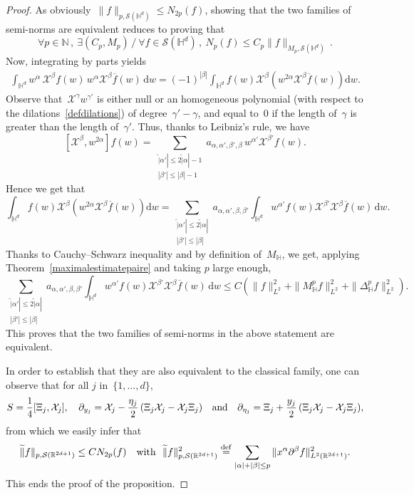 \documentclass[10pt]{amsart}
\theoremstyle{definition}\newtheorem{defi}[theo]{Definition}\newtheorem{rema}[theo]{Remark}\newtheorem{exam}[theo]{Example}\newtheorem{exem}[theo]{Example}\newtheorem{nota}[theo]{Notation}
\newcommand*\sumetage[2]{\sum_{\substack{{#1}\\{#2}}}}
\newcommand{\D}{\Delta}
\newcommand{\wt}{\widetilde}
\newcommand*\cS{\mathcal{S}}
\newcommand*\cX{\mathcal{X}}
\newcommand*\N{\mathbb{N}}
\newcommand*\R{\mathbb{R}}
\newcommand*\bbH{\mathbb{H}}
\newcommand{\andf}{\quad\hbox{and}\quad}
\newcommand*\eqdefa{\overset{\mathrm{def}}{=}}
\newcommand*{\dd}{\mathrm{d}}
\newcommand{\dw}{\dd w}
\renewcommand*{\cdotp}{.}
\let\oldexists\exists
\renewcommand*{\exists}{\mathrel{\oldexists}}
\let\oldforall\forall
\renewcommand*{\forall}{\mathrel{\oldforall}}
\begin{document}
\begin{proof}
As obviously~$\|f\|_{p,\cS(\bbH^d)}\leq N_{2p} (f)$, showing that the two families of semi-norms are equivalent reduces to proving that
\begin{equation}\label{c:schwartzdemooeq3}
\forall p\in \N\,,\ \exists (C_p,M_p)\,/\ \forall f\in \cS(\bbH^d)\,,\ N_p(f)\leq C_p\|f\|_{M_p,\cS(\bbH^d)} \,.
\end{equation}
Now, integrating by parts yields
\begin{align*}
\int_{\bbH^d} w^\alpha \,\cX^\beta f(w) \,w^\alpha \cX^\beta\overline f(w)\,\dw = (-1)^{|\beta|} \int_{\bbH^d} f(w) \cX^\beta\left(w^{2\alpha} \cX^\beta \overline f(w)\right)\dw.
\end{align*}
Observe that~$\cX^\gamma w^{\gamma'}$ is either null or an homogeneous polynomial (with respect to the dilations~\eqref{defdilations}) of degree~$\gamma'-\gamma$, and equal to~$0$ if the length of~$\gamma$ is greater than the length of~$\gamma'$. Thus, thanks to Leibniz's rule, we have
\begin{equation}\label{c:schwartzdemooeq0}
[\cX^\beta,w^{2\alpha}] f(w) = \sumetage { \wt |\alpha'|\leq 2\wt |\alpha|-1} {|\beta'|\leq|\beta|-1} a_{\alpha,\alpha',\beta',\beta} \,w^{\alpha'} \cX^{\beta'}f(w).
\end{equation}
Hence we get that
\[
\int_{\bbH^d} f(w) \cX^\beta\left(w^{2\alpha} \cX^\beta \overline f(w)\right)\dw =
\sumetage {\wt|\alpha'|\leq 2 \wt |\alpha|} {|\beta'|\leq |\beta|} a_{\alpha,\alpha',\beta,\beta'} \int_{\bbH^d} w^{\alpha'} f(w) \cX^{\beta'} \cX^\beta\overline f(w) \,\dw.
\]
Thanks to Cauchy--Schwarz inequality and by definition of~$M_\bbH$, we get, applying Theorem~\ref{maximalestimatepaire} and taking $p$ large enough,
\[
\sumetage {\wt|\alpha'|\leq 2 \wt |\alpha|} {|\beta'|\leq |\beta|} a_{\alpha,\alpha',\beta,\beta'} \int_{\bbH^d} w^{\alpha'} f(w) \cX^{\beta'} \cX^\beta\overline f(w)\, \dw
\leq C\left(\|f\|_{L^2}^2 + \|M_\bbH^{p} f\|_{L^2} ^2+ \|\D_\bbH^{p} f\|_{L^2}^2\right)\cdotp
\]
This proves that the two families of semi-norms in the above statement are equivalent.

In order to establish that they are also equivalent to the classical family, one can observe that for all $j$ in~$ \{1, \dots,d \}$,
\[
S = \frac 1 4 [\Xi_j,\cX_j],\quad \partial_{y_j}= \cX_j - \frac {\eta_j} 2 \,(\Xi_j\cX_j- \cX_j \Xi_j) \andf \partial_{\eta_j}= \Xi_j+ \frac {y_j} 2 \,(\Xi_j\cX_j- \cX_j \Xi_j),
\]
from which we easily infer that
\[
\wt \|f\|_{p,\cS(\R^{2d+1})}
\leq C N_{2p}(f)
\quad\hbox{with }\ \wt \|f\|_{p,\cS(\R^{2d+1})}^2 \eqdefa \sum_{|\alpha|+|\beta|\leq p} \|x^\alpha \partial^\beta f \|_{L^2(\R^{2d+1})}^2.
\]
This ends the proof of the proposition.
\end{proof}
\end{document}
